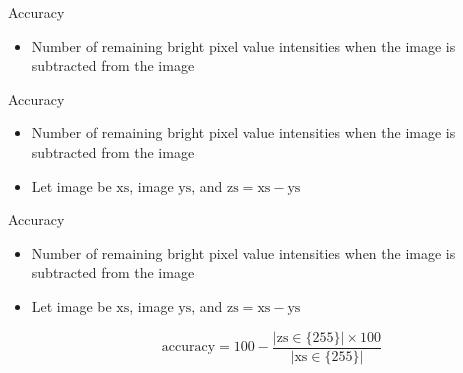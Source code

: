 \begin{frame}{Accuracy}
    \begin{itemize}
        \item Number of remaining bright pixel value intensities when the \usno image is subtracted from the \panstarrs image
    \end{itemize}
\end{frame}

\begin{frame}{Accuracy}
    \begin{itemize}
        \item Number of remaining bright pixel value intensities when the \usno image is subtracted from the \panstarrs image
        \item Let \usno image be $\text{xs}$, \panstarrs image $\text{ys}$, and $\text{zs} = \text{xs} - \text{ys}$
    \end{itemize}
\end{frame}

\begin{frame}{Accuracy}
    \begin{itemize}
        \item Number of remaining bright pixel value intensities when the \usno image is subtracted from the \panstarrs image
        \item Let \usno image be $\text{xs}$, \panstarrs image $\text{ys}$, and $\text{zs} = \text{xs} - \text{ys}$

        \begin{equation}
            \text{accuracy} = 100 - \frac{|\text{zs} \in \{255\} | \times 100}{|\text{xs} \in \{255\} |}
        \end{equation}
    \end{itemize}
\end{frame}